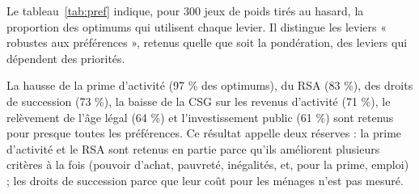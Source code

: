 Le tableau~\ref{tab:pref} indique, pour 300 jeux de poids tirés au hasard, la proportion des optimums qui utilisent
chaque levier. Il distingue les leviers « robustes aux préférences », retenus quelle que soit la pondération, des
leviers qui dépendent des priorités.

\begin{table}[htbp]\centering\small
\caption{Fréquence d'emploi des leviers dans 300 optimums à poids aléatoires (périmètre principal, dette à 10 ans
non accrue, pertes par décile ≤ 1 \%).}\label{tab:pref}
\end{table}

La hausse de la prime d'activité (97 \% des optimums), du RSA (83 \%), des droits de succession (73 \%), la baisse
de la CSG sur les revenus d'activité (71 \%), le relèvement de l'âge légal (64 \%) et l'investissement public (61 \%)
sont retenus pour presque toutes les préférences. Ce résultat appelle deux réserves : la prime d'activité et le RSA
sont retenus en partie parce qu'ils améliorent plusieurs critères à la fois (pouvoir d'achat, pauvreté, inégalités,
et, pour la prime, emploi) ; les droits de succession parce que leur coût pour les ménages n'est pas mesuré.
